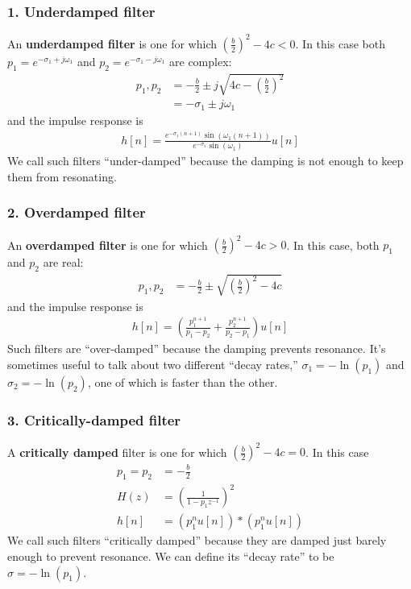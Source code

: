 \documentclass{beamer}
\begin{document}
\begin{frame}
  \frametitle{1. Underdamped filter}

  An \textbf{underdamped filter} is one for which
  $\left(\frac{b}{2}\right)^2-4c<0$.  In this case both $p_1=e^{-\sigma_1+j\omega_1}$ and
  $p_2=e^{-\sigma_1-j\omega_1}$ are complex:
  \begin{align*}
    p_1,p_2 &= -\frac{b}{2}\pm j\sqrt{4c-\left(\frac{b}{2}\right)^2}\\
    &= -\sigma_1\pm j\omega_1
  \end{align*}
  and the impulse response is
  \begin{align*}
    h[n]=\frac{e^{-\sigma_1 (n+1)}\sin(\omega_1(n+1))}{e^{-\sigma_1}\sin(\omega_1)}u[n]
  \end{align*}
  We call such filters ``under-damped'' because the damping is not
  enough to keep them from resonating.
\end{frame}
\begin{frame}
  \frametitle{2. Overdamped filter}

  An \textbf{overdamped filter} is one for which
  $\left(\frac{b}{2}\right)^2-4c>0$.  In this case, both $p_1$ and
  $p_2$ are real:
  \begin{align*}
    p_1,p_2 &= -\frac{b}{2}\pm \sqrt{\left(\frac{b}{2}\right)^2-4c}
  \end{align*}
  and the impulse response is
  \begin{align*}
    h[n]=\left(\frac{p_1^{n+1}}{p_1-p_2}+ \frac{p_2^{n+1}}{p_2-p_1}\right)u[n]
  \end{align*}
  Such filters are ``over-damped'' because the damping prevents
  resonance.  It's sometimes useful to talk about two different
  ``decay rates,'' $\sigma_1=-\ln(p_1)$ and $\sigma_2=-\ln(p_2)$, one
  of which is faster than the other.
\end{frame}

\begin{frame}
  \frametitle{3. Critically-damped filter}

  A \textbf{critically damped} filter is one for which
  $\left(\frac{b}{2}\right)^2-4c=0$.  In this case
  \begin{align*}
    p_1=p_2 &= -\frac{b}{2}\\
    H(z) &= \left(\frac{1}{1-p_1z^{-1}}\right)^2\\
    h[n] &= \left(p_1^nu[n]\right)\ast \left(p_1^nu[n]\right)
  \end{align*}
  We call such filters ``critically damped'' because they are damped
  just barely enough to prevent resonance.  We can define its ``decay
  rate'' to be $\sigma=-\ln(p_1)$.
\end{frame}
\end{document}
